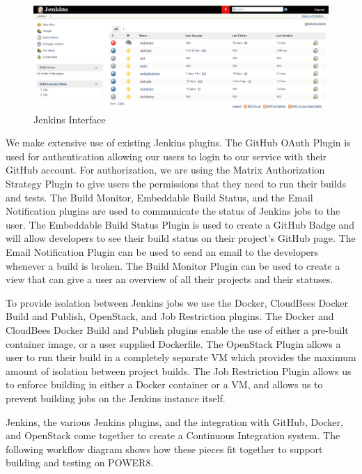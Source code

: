 \documentclass[10pt,onecolumn,journal,draftclsnofoot]{IEEEtran}
\begin{document}
\begin{figure}[H] 
  \includegraphics[width=\textwidth]{images/jenkins.eps}
  \caption{Jenkins Interface}
\end{figure}
\clearpage
We make extensive use of existing Jenkins plugins.
The GitHub OAuth Plugin is used for authentication allowing our users to login to our service with their GitHub account.
For authorization, we are using the Matrix Authorization Strategy Plugin to give users the permissions that they need to run their builds and tests.
The Build Monitor, Embeddable Build Status, and the Email Notification plugins are used to communicate the status of Jenkins jobs to the user.
The Embeddable Build Status Plugin is used to create a GitHub Badge and will allow developers to see their build status on their project's GitHub page.
The Email Notification Plugin can be used to send an email to the developers whenever a build is broken.
The Build Monitor Plugin can be used to create a view that can give a user an overview of all their projects and their statuses.

To provide isolation between Jenkins jobs we use the Docker, CloudBees Docker Build and Publish, OpenStack, and Job Restriction plugins. 
The Docker and CloudBees Docker Build and Publish plugins enable the use of either a pre-built container image, or a user supplied Dockerfile.
The OpenStack Plugin allows a user to run their build in a completely separate VM which provides the maximum amount of isolation between project builds. 
The Job Restriction Plugin allows us to enforce building in either a Docker container or a VM, and allows us to prevent building jobs on the Jenkins instance itself. 

Jenkins, the various Jenkins plugins, and the integration with GitHub, Docker, and OpenStack come together to create a Continuous Integration system.
The following workflow diagram shows how these pieces fit together to support building and testing on POWER8.
\end{document}
